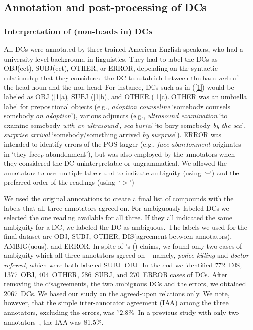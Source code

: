 \documentclass[output=paper]{langsci/langscibook}
\begin{document}
\subsection{Annotation and post-processing of DCs}\label{sec:annotation}
\subsubsection{Interpretation of (non-heads in) DCs}\label{sec:annotation:relation}
All DCs were annotated by three trained American English speakers, who had a university level background in  linguistics. They had to label the DCs as OBJ(ect), SUBJ(ect), OTHER, or ERROR, depending on the syntactic relationship that they considered the DC to establish between the base verb of the head noun and the non-head.
For instance, DCs such as in (\ref{1}) would be labeled as OBJ (\ref{1}a), SUBJ (\ref{1}b), and OTHER (\ref{1}c).
OTHER was an umbrella label for prepositional objects (e.g., \textit{adoption counseling} \lq somebody counsels somebody \textit{on adoption}\rq), various adjuncts (e.g., \textit{ultrasound examination} \lq to examine somebody \textit{with an ultrasound}\rq, \textit{sea burial} \lq to bury somebody \textit{by the sea}\rq, \textit{surprise arrival} \lq somebody/something arrived \textit{by surprise}\rq).
ERROR was  {intended} to identify errors of the POS tagger (e.g., \textit{face abandonment} originates in \lq they face$_V$ abandonment\rq), but was also employed by the annotators when they  considered the DC uninterpretable or  ungrammatical.
We allowed the annotators to use multiple labels and to indicate ambiguity (using~\lq --\rq) and the preferred order of the readings (using~\lq $>$\rq).

We used the original annotations to create a final list of compounds with the labels that all three annotators agreed on. 
For ambiguously labeled DCs we selected the one reading available for all three. 
If they all indicated the same ambiguity for a DC, we labeled the DC as ambiguous.\ 
The labels we used for the final dataset are OBJ, SUBJ, OTHER, DIS(agreement between annotators), AMBIG(uous), and ERROR.
In spite of \citeauthor{borer:13}'s (\citeyear{borer:13}) claims, we found only two cases of ambiguity which all three annotators agreed on -- namely, \textit{police killing} and \textit{doctor referral}, which were both labeled SUBJ--OBJ.
In the end we identified 772~DIS, 1377~OBJ, 404~OTHER, 286~SUBJ, and 270~ERROR cases of DCs.
After removing the disagreements, the two ambiguous DCs and the errors, we obtained 2067~DCs. We based our study on the agreed-upon relations only. We note, however, that the simple inter-annotator agreement (IAA) among the three annotators, excluding the errors, was 72.8\%. In a previous study with only two annotators~\citep{author:et:al:16}, the IAA was~81.5\%.
\end{document}
